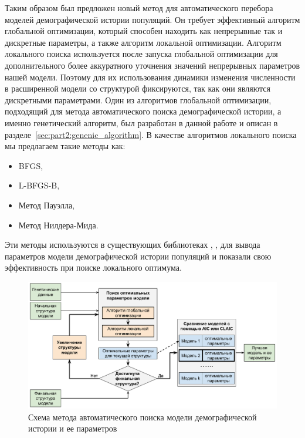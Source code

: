 Таким образом был предложен новый метод для автоматического перебора моделей демографической истории популяций.
Он требует эффективный алгоритм глобальной оптимизации, который способен находить как непрерывные так и дискретные параметры, а также алгоритм локальной оптимизации.
Алгоритм локального поиска используется после запуска глобальной оптимизации для дополнительного более аккуратного уточнения значений непрерывных параметров нашей модели.
Поэтому для их использования динамики изменения численности в расширенной модели со структурой фиксируются, так как они являются дискретными параметрами.
Один из алгоритмов глобальной оптимизации, подходящий для метода автоматического поиска демографической истории, а именно генетический алгоритм, был разработан в данной работе и описан в разделе~\ref{sec:part2:genenic_algorithm}.
В качестве алгоритмов локального поиска мы предлагаем такие методы как:
\begin{itemize}
    \item BFGS,
    \item L-BFGS-B,
    \item Метод Пауэлла,
    \item Метод Нилдера-Мида.
\end{itemize}
Эти методы используются в существующих библиотеках \dadi, \moments, \momentsLD для вывода параметров модели демографической истории популяций и показали свою эффективность при поиске локального оптимума.

\begin{figure}
    \centering
    \includegraphics[width=\textwidth]{images/part2/auto_model/general_scheme_rus.pdf}
    \caption{Схема метода автоматического поиска модели демографической истории и ее параметров}
    \label{fig:part2:auto_model:algorithm}
\end{figure}

